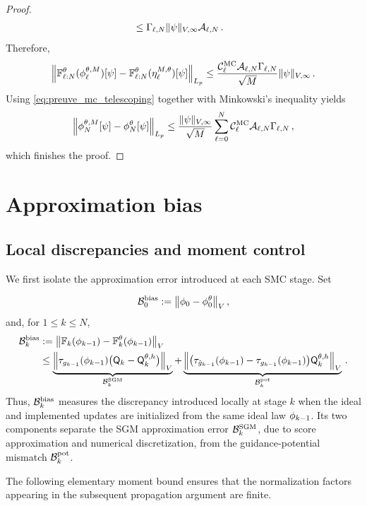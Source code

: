 \documentclass[11pt]{article}
\theoremstyle{plain}
\theoremstyle{definition}
\theoremstyle{remark}
\begin{document}
\begin{proof}
\begin{align*}
& \le \Gamma_{\ell,N}\|\psi\|_{V,\infty} \mathcal A_{\ell,N} \,.
\end{align*}
Therefore,
$$
\normEc{ \filtertransform{\ell:N}[\theta](\mcfilter{\ell})[\psi] - \filtertransform{\ell:N}[\theta](\eta_\ell^{M,\theta})[\psi] }_{L_p}
\le \frac{ \mathcal{C}_\ell^{\rm MC} \mathcal A_{\ell,N} \Gamma_{\ell,N} }{\sqrt M} \|\psi\|_{V,\infty} \eqsp.
$$
Using \eqref{eq:preuve_mc_telescoping} together with Minkowski's inequality yields
$$
\normEc{ \mcfilter{N}[\psi]-\approxfilter{N}[\psi] }_{L_p} \le \frac{\|\psi\|_{V,\infty}}{\sqrt M} \sum_{\ell=0}^{N} \mathcal{C}_\ell^{\rm MC} \mathcal A_{\ell,N} \Gamma_{\ell,N} \eqsp,
$$
which finishes the proof.
\end{proof}


\section{Approximation bias}
\label{app:kernel_bias}

\subsection{Local discrepancies and moment control}

We first isolate the approximation error introduced at each SMC stage.
Set

$$
\mathcal B_0^{\rm bias}
\eqdef
\vnorm[\filter{0}-\approxfilter{0}][V],
$$
and, for $1\le k\le N$,
\begin{align} \label{eq:local_bias_split}
\mathcal B_k^{\rm bias}
&\eqdef \vnorm[ \filtertransform{k}(\filter{k-1}) - \filtertransform{k}[\theta](\filter{k-1})][V] \\
&\le \underbrace{ \vnorm[ \tau_{\pot{k-1}}(\filter{k-1}) \bigl(\mk{k}-\mk{k}[\theta,h]\bigr) ][V]
}_{\mathcal B_k^{\rm SGM}} +
\underbrace{ \vnorm[ \bigl( \tau_{\approxpot{k-1}}(\filter{k-1}) - \tau_{\pot{k-1}}(\filter{k-1}) \bigr) \mk{k}[\theta,h] ][V] }_{\mathcal B_k^{\rm pot}} \eqsp. \notag
\end{align}
Thus, $\mathcal B_k^{\rm bias}$ measures the discrepancy introduced locally at stage $k$ when the ideal and implemented updates are initialized from the same ideal law $\filter{k-1}$. Its two components separate the SGM approximation error $\mathcal B_k^{\rm SGM}$, due to score approximation and numerical discretization, from the guidance-potential mismatch $\mathcal B_k^{\rm pot}$.

The following elementary moment bound ensures that the normalization factors appearing in the subsequent propagation argument are finite.
\end{document}
